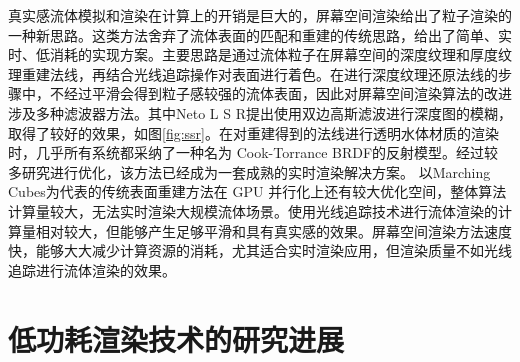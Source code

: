 \indent 真实感流体模拟和渲染在计算上的开销是巨大的，屏幕空间渲染\cite{van2009screen}给出了粒子渲染的一种新思路。这类方法舍弃了流体表面的匹配和重建的传统思路，给出了简单、实时、低消耗的实现方案。主要思路是通过流体粒子在屏幕空间的深度纹理和厚度纹理重建法线，再结合光线追踪操作对表面进行着色。在进行深度纹理还原法线的步骤中，不经过平滑会得到粒子感较强的流体表面，因此对屏幕空间渲染算法的改进涉及多种滤波器方法\cite{muller2007screen, bagar2010layered, neto2017real, truong2018narrow, oliveira2022narrow}。其中Neto L S R\cite{neto2017real}提出使用双边高斯滤波进行深度图的模糊，取得了较好的效果，如图\ref{fig:ssr}。在对重建得到的法线进行透明水体材质的渲染时，几乎所有系统都采纳了一种名为 Cook-Torrance BRDF\cite{cook1982reflectance}的反射模型。经过较多研究进行优化\cite{schlick1994inexpensive, burley2012physically}，该方法已经成为一套成熟的实时渲染解决方案。
\newline
\indent 以Marching Cubes为代表的传统表面重建方法在 GPU 并行化上还有较大优化空间，整体算法计算量较大，无法实时渲染大规模流体场景。使用光线追踪技术进行流体渲染的计算量相对较大，但能够产生足够平滑和具有真实感的效果。屏幕空间渲染方法速度快，能够大大减少计算资源的消耗，尤其适合实时渲染应用，但渲染质量不如光线追踪进行流体渲染的效果。

\section{低功耗渲染技术的研究进展}

